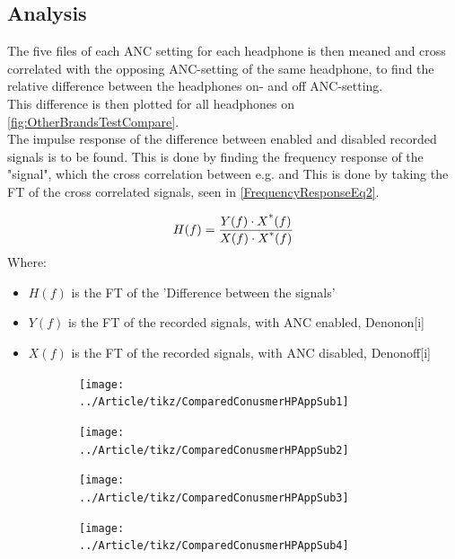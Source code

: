 \subsection{Analysis}
The five files of each ANC setting for each headphone is then meaned and cross correlated with the opposing ANC-setting of the same headphone, to find the relative difference between the headphones on- and off ANC-setting.\\
This difference is then plotted for all headphones on \autoref{fig:OtherBrandsTestCompare}.
\\
The impulse response of the difference between enabled and disabled recorded signals is to be found.
This is done by finding the frequency response of the "signal", which the cross correlation between e.g.  and  This is done by taking the FT of the cross correlated signals, seen in \autoref{FrequencyResponseEq2}.


\begin{equation}\label{FrequencyResponseEq2}
H(f) = \frac{Y(f) \cdot X\textsuperscript{*}(f)}{X(f) \cdot X\textsuperscript{*}(f)}
\end{equation}
Where:
\begin{itemize}
	\item $H(f)$ is the FT of the 'Difference between the signals'
	\item $Y(f)$ is the FT of the recorded signals, with ANC enabled,  Denonon[i]
	\item $X(f)$ is the FT of the recorded signals, with ANC disabled, Denonoff[i]
\end{itemize}

\begin{figure}[H]
	\centering
	\begin{subfigure}[b]{.48\textwidth}
	\centering
	\texttt{[image: ../Article/tikz/ComparedConusmerHPAppSub1]}
	\end{subfigure}
	\begin{subfigure}[b]{.48\textwidth}
		\centering
	\texttt{[image: ../Article/tikz/ComparedConusmerHPAppSub2]}
	\end{subfigure}
	\begin{subfigure}[b]{.48\textwidth}
	\centering
	\texttt{[image: ../Article/tikz/ComparedConusmerHPAppSub3]}
	\end{subfigure}
	\begin{subfigure}[b]{.48\textwidth}
	\centering
	\texttt{[image: ../Article/tikz/ComparedConusmerHPAppSub4]}
	\end{subfigure}
\end{figure}


